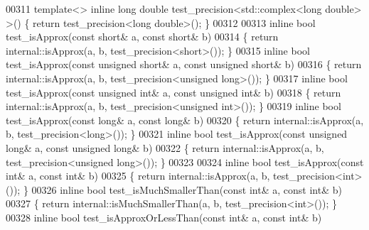 \begin{DoxyCode}
00311 \textcolor{keyword}{template}<> \textcolor{keyword}{inline} \textcolor{keywordtype}{long} \textcolor{keywordtype}{double} test\_precision<std::complex<long double> >() \{ \textcolor{keywordflow}{return} test\_precision<long
       double>(); \}
00312 
00313 \textcolor{keyword}{inline} \textcolor{keywordtype}{bool} test\_isApprox(\textcolor{keyword}{const} \textcolor{keywordtype}{short}& a, \textcolor{keyword}{const} \textcolor{keywordtype}{short}& b)
00314 \{ \textcolor{keywordflow}{return} internal::isApprox(a, b, test\_precision<short>()); \}
00315 \textcolor{keyword}{inline} \textcolor{keywordtype}{bool} test\_isApprox(\textcolor{keyword}{const} \textcolor{keywordtype}{unsigned} \textcolor{keywordtype}{short}& a, \textcolor{keyword}{const} \textcolor{keywordtype}{unsigned} \textcolor{keywordtype}{short}& b)
00316 \{ \textcolor{keywordflow}{return} internal::isApprox(a, b, test\_precision<unsigned long>()); \}
00317 \textcolor{keyword}{inline} \textcolor{keywordtype}{bool} test\_isApprox(\textcolor{keyword}{const} \textcolor{keywordtype}{unsigned} \textcolor{keywordtype}{int}& a, \textcolor{keyword}{const} \textcolor{keywordtype}{unsigned} \textcolor{keywordtype}{int}& b)
00318 \{ \textcolor{keywordflow}{return} internal::isApprox(a, b, test\_precision<unsigned int>()); \}
00319 \textcolor{keyword}{inline} \textcolor{keywordtype}{bool} test\_isApprox(\textcolor{keyword}{const} \textcolor{keywordtype}{long}& a, \textcolor{keyword}{const} \textcolor{keywordtype}{long}& b)
00320 \{ \textcolor{keywordflow}{return} internal::isApprox(a, b, test\_precision<long>()); \}
00321 \textcolor{keyword}{inline} \textcolor{keywordtype}{bool} test\_isApprox(\textcolor{keyword}{const} \textcolor{keywordtype}{unsigned} \textcolor{keywordtype}{long}& a, \textcolor{keyword}{const} \textcolor{keywordtype}{unsigned} \textcolor{keywordtype}{long}& b)
00322 \{ \textcolor{keywordflow}{return} internal::isApprox(a, b, test\_precision<unsigned long>()); \}
00323 
00324 \textcolor{keyword}{inline} \textcolor{keywordtype}{bool} test\_isApprox(\textcolor{keyword}{const} \textcolor{keywordtype}{int}& a, \textcolor{keyword}{const} \textcolor{keywordtype}{int}& b)
00325 \{ \textcolor{keywordflow}{return} internal::isApprox(a, b, test\_precision<int>()); \}
00326 \textcolor{keyword}{inline} \textcolor{keywordtype}{bool} test\_isMuchSmallerThan(\textcolor{keyword}{const} \textcolor{keywordtype}{int}& a, \textcolor{keyword}{const} \textcolor{keywordtype}{int}& b)
00327 \{ \textcolor{keywordflow}{return} internal::isMuchSmallerThan(a, b, test\_precision<int>()); \}
00328 \textcolor{keyword}{inline} \textcolor{keywordtype}{bool} test\_isApproxOrLessThan(\textcolor{keyword}{const} \textcolor{keywordtype}{int}& a, \textcolor{keyword}{const} \textcolor{keywordtype}{int}& b)

\end{DoxyCode}
